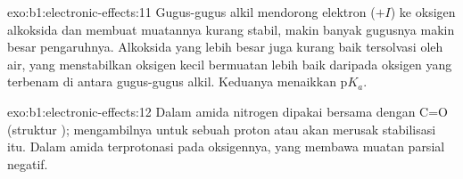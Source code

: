 \begin{solution}{exo:b1:electronic-effects:11}
Gugus-gugus alkil mendorong elektron ($+I$) ke oksigen alkoksida dan
membuat muatannya kurang stabil, makin banyak gugusnya makin besar
pengaruhnya. Alkoksida yang lebih besar juga kurang baik tersolvasi oleh
air, yang menstabilkan oksigen kecil bermuatan lebih baik daripada
oksigen yang terbenam di antara gugus-gugus alkil. Keduanya menaikkan
$\mathrm{p}K_a$.
\end{solution}

\begin{solution}{exo:b1:electronic-effects:12}
Dalam amida  nitrogen dipakai bersama dengan C=O
(struktur ); mengambilnya untuk sebuah proton atau 
akan merusak stabilisasi itu. Dalam  amida terprotonasi pada
oksigennya, yang membawa muatan parsial negatif.
\end{solution}

